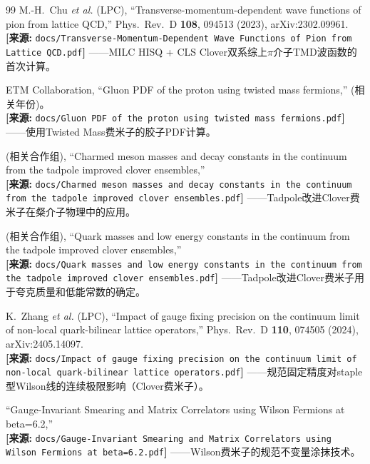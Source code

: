 \documentclass[12pt,a4paper]{ctexart}
\theoremstyle{definition}
\begin{document}
\begin{thebibliography}{99}
M.-H.~Chu \textit{et al.} (LPC),
``Transverse-momentum-dependent wave functions of pion from lattice QCD,''
Phys.\ Rev.\ D \textbf{108}, 094513 (2023), arXiv:2302.09961.
\\\textbf{[来源:} \texttt{docs/Transverse-Momentum-Dependent Wave Functions of Pion from Lattice QCD.pdf}\textbf{]}
——MILC HISQ + CLS Clover双系综上$\pi$介子TMD波函数的首次计算。

ETM Collaboration,
``Gluon PDF of the proton using twisted mass fermions,''
(相关年份)。
\\\textbf{[来源:} \texttt{docs/Gluon PDF of the proton using twisted mass fermions.pdf}\textbf{]}
——使用Twisted Mass费米子的胶子PDF计算。

(相关合作组),
``Charmed meson masses and decay constants in the continuum from the tadpole improved clover ensembles,''
\\\textbf{[来源:} \texttt{docs/Charmed meson masses and decay constants in the continuum from the tadpole improved clover ensembles.pdf}\textbf{]}
——Tadpole改进Clover费米子在粲介子物理中的应用。

(相关合作组),
``Quark masses and low energy constants in the continuum from the tadpole improved clover ensembles,''
\\\textbf{[来源:} \texttt{docs/Quark masses and low energy constants in the continuum from the tadpole improved clover ensembles.pdf}\textbf{]}
——Tadpole改进Clover费米子用于夸克质量和低能常数的确定。

K.~Zhang \textit{et al.} (LPC),
``Impact of gauge fixing precision on the continuum limit of non-local quark-bilinear lattice operators,''
Phys.\ Rev.\ D \textbf{110}, 074505 (2024), arXiv:2405.14097.
\\\textbf{[来源:} \texttt{docs/Impact of gauge fixing precision on the continuum limit of non-local quark-bilinear lattice operators.pdf}\textbf{]}
——规范固定精度对staple型Wilson线的连续极限影响（Clover费米子）。

``Gauge-Invariant Smearing and Matrix Correlators using Wilson Fermions at beta=6.2,''
\\\textbf{[来源:} \texttt{docs/Gauge-Invariant Smearing and Matrix Correlators using Wilson Fermions at beta=6.2.pdf}\textbf{]}
——Wilson费米子的规范不变量涂抹技术。

\end{thebibliography}
\end{document}
